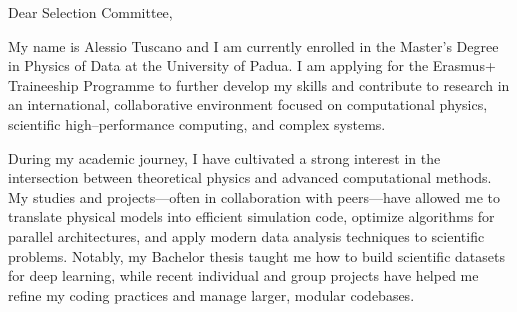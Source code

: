 \documentclass[a4paper,11pt]{article}
\begin{document}






Dear Selection Committee,

My name is Alessio Tuscano and I am currently enrolled in the Master’s Degree in Physics of Data at the University of Padua. I am applying for the Erasmus+ Traineeship Programme to further develop my skills and contribute to research in an international, collaborative environment focused on computational physics, scientific high--performance computing, and complex systems.

During my academic journey, I have cultivated a strong interest in the intersection between theoretical physics and advanced computational methods. My studies and projects—often in collaboration with peers—have allowed me to translate physical models into efficient simulation code, optimize algorithms for parallel architectures, and apply modern data analysis techniques to scientific problems. Notably, my Bachelor thesis taught me how to build scientific datasets for deep learning, while recent individual and group projects have helped me refine my coding practices and manage larger, modular codebases.
\end{document}
